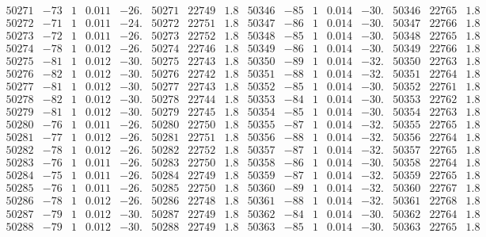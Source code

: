 \documentclass[11pt,reqno,a4letter]{article}
\numberwithin{figure}{section}
\numberwithin{table}{section}
\theoremstyle{plain}
\numberwithin{theorem}{section}
\theoremstyle{definition}
\begin{document}
\begin{table}[ht]
\begin{equation*}
{\begin{array}{ccccc|ccc||ccccc|ccc}
50271 & -73 & 1 & 0.011 & -26. & 50271 & 22749 & 1.8 & 50346 & -85 & 1 & 0.014 & -30. & 50346 & 22765 & 1.8  \\
50272 & -71 & 1 & 0.011 & -24. & 50272 & 22751 & 1.8 & 50347 & -86 & 1 & 0.014 & -30. & 50347 & 22766 & 1.8  \\
50273 & -72 & 1 & 0.011 & -26. & 50273 & 22752 & 1.8 & 50348 & -85 & 1 & 0.014 & -30. & 50348 & 22765 & 1.8  \\
50274 & -78 & 1 & 0.012 & -26. & 50274 & 22746 & 1.8 & 50349 & -86 & 1 & 0.014 & -30. & 50349 & 22766 & 1.8  \\
50275 & -81 & 1 & 0.012 & -30. & 50275 & 22743 & 1.8 & 50350 & -89 & 1 & 0.014 & -32. & 50350 & 22763 & 1.8  \\
50276 & -82 & 1 & 0.012 & -30. & 50276 & 22742 & 1.8 & 50351 & -88 & 1 & 0.014 & -32. & 50351 & 22764 & 1.8  \\
50277 & -81 & 1 & 0.012 & -30. & 50277 & 22743 & 1.8 & 50352 & -85 & 1 & 0.014 & -30. & 50352 & 22761 & 1.8  \\
50278 & -82 & 1 & 0.012 & -30. & 50278 & 22744 & 1.8 & 50353 & -84 & 1 & 0.014 & -30. & 50353 & 22762 & 1.8  \\
50279 & -81 & 1 & 0.012 & -30. & 50279 & 22745 & 1.8 & 50354 & -85 & 1 & 0.014 & -30. & 50354 & 22763 & 1.8  \\
50280 & -76 & 1 & 0.011 & -26. & 50280 & 22750 & 1.8 & 50355 & -87 & 1 & 0.014 & -32. & 50355 & 22765 & 1.8  \\
50281 & -77 & 1 & 0.012 & -26. & 50281 & 22751 & 1.8 & 50356 & -88 & 1 & 0.014 & -32. & 50356 & 22764 & 1.8  \\
50282 & -78 & 1 & 0.012 & -26. & 50282 & 22752 & 1.8 & 50357 & -87 & 1 & 0.014 & -32. & 50357 & 22765 & 1.8  \\
50283 & -76 & 1 & 0.011 & -26. & 50283 & 22750 & 1.8 & 50358 & -86 & 1 & 0.014 & -30. & 50358 & 22764 & 1.8  \\
50284 & -75 & 1 & 0.011 & -26. & 50284 & 22749 & 1.8 & 50359 & -87 & 1 & 0.014 & -32. & 50359 & 22765 & 1.8  \\
50285 & -76 & 1 & 0.011 & -26. & 50285 & 22750 & 1.8 & 50360 & -89 & 1 & 0.014 & -32. & 50360 & 22767 & 1.8  \\
50286 & -78 & 1 & 0.012 & -26. & 50286 & 22748 & 1.8 & 50361 & -88 & 1 & 0.014 & -32. & 50361 & 22768 & 1.8  \\
50287 & -79 & 1 & 0.012 & -30. & 50287 & 22749 & 1.8 & 50362 & -84 & 1 & 0.014 & -30. & 50362 & 22764 & 1.8  \\
50288 & -79 & 1 & 0.012 & -30. & 50288 & 22749 & 1.8 & 50363 & -85 & 1 & 0.014 & -30. & 50363 & 22765 & 1.8  \\

\end{array}}
\end{equation*}
\end{table}
\end{document}
